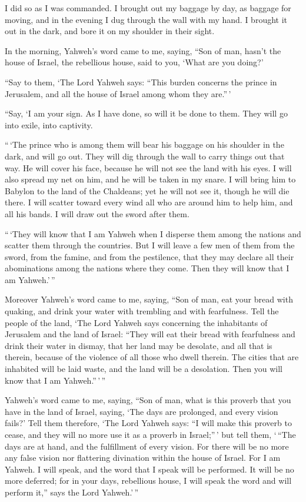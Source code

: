  I did so as I was commanded. I brought out my baggage by
day, as baggage for moving, and in the evening I dug through the wall
with my hand. I brought it out in the dark, and bore it on my shoulder
in their sight.

 In the morning, Yahweh's word came to me, saying,
 ``Son of man, hasn't the house of Israel, the rebellious
house, said to you, `What are you doing?'

 ``Say to them, `The Lord Yahweh says: ``This burden
concerns the prince in Jerusalem, and all the house of Israel among whom
they are.''\,'

 ``Say, `I am your sign. As I have done, so will it be
done to them. They will go into exile, into captivity.

 ``\,`The prince who is among them will bear his baggage
on his shoulder in the dark, and will go out. They will dig through the
wall to carry things out that way. He will cover his face, because he
will not see the land with his eyes.  I will also spread
my net on him, and he will be taken in my snare. I will bring him to
Babylon to the land of the Chaldeans; yet he will not see it, though he
will die there.  I will scatter toward every wind all who
are around him to help him, and all his bands. I will draw out the sword
after them.

 ``\,`They will know that I am Yahweh when I disperse
them among the nations and scatter them through the countries.
 But I will leave a few men of them from the sword, from
the famine, and from the pestilence, that they may declare all their
abominations among the nations where they come. Then they will know that
I am Yahweh.'\,''

 Moreover Yahweh's word came to me, saying,
 ``Son of man, eat your bread with quaking, and drink
your water with trembling and with fearfulness.  Tell the
people of the land, `The Lord Yahweh says concerning the inhabitants of
Jerusalem and the land of Israel: ``They will eat their bread with
fearfulness and drink their water in dismay, that her land may be
desolate, and all that is therein, because of the violence of all those
who dwell therein.  The cities that are inhabited will be
laid waste, and the land will be a desolation. Then you will know that I
am Yahweh.''\,'\,''

 Yahweh's word came to me, saying,  ``Son
of man, what is this proverb that you have in the land of Israel,
saying, `The days are prolonged, and every vision fails?'
 Tell them therefore, `The Lord Yahweh says: ``I will
make this proverb to cease, and they will no more use it as a proverb in
Israel;''\,' but tell them, `\,``The days are at hand, and the
fulfillment of every vision.  For there will be no more
any false vision nor flattering divination within the house of Israel.
 For I am Yahweh. I will speak, and the word that I speak
will be performed. It will be no more deferred; for in your days,
rebellious house, I will speak the word and will perform it,'' says the
Lord Yahweh.'\,''

